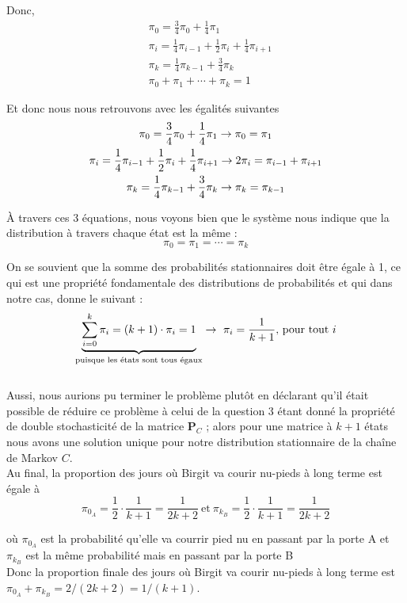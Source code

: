 \documentclass{article}
\begin{document}
   
    Donc,
    \begin{align}
        &\pi_0 = \frac{3}{4}\pi_0 + \frac{1}{4}\pi_1 \\
        &\pi_i = \frac{1}{4}\pi_{i-1} + \frac{1}{2}\pi_i + \frac{1}{4}\pi_{i+1} \\
        &\pi_k = \frac{1}{4}\pi_{k-1} + \frac{3}{4}\pi_k \\
        &\pi_0 + \pi_1 + \cdots + \pi_k = 1 
    \end{align}

    \vspace{.2cm}
    Et donc nous nous retrouvons avec les égalités suivantes
    \begin{gather}
        \pi_0 = \frac{3}{4}\pi_0 + \frac{1}{4}\pi_1 \to \pi_0 = \pi_1 \notag \\
        \pi_i = \frac{1}{4}\pi_{i-1} + \frac{1}{2}\pi_i + \frac{1}{4}\pi_{i+1} \to 2\pi_i = \pi_{i-1} + \pi_{i+1} \notag \\
        \pi_k = \frac{1}{4}\pi_{k-1} + \frac{3}{4}\pi_k \to \pi_k = \pi_{k-1} \notag 
    \end{gather}

    À travers ces 3 équations, nous voyons bien que le système nous indique que la distribution à travers chaque état est la même :
    \[
        \pi_0 = \pi_1 = \cdots = \pi_k
    \]

    On se souvient que la somme des probabilités stationnaires doit être égale à 1, ce qui est une propriété fondamentale des distributions de probabilités et qui dans notre cas, donne le suivant :
    \[
        \underbrace{\sum^k_{i=0} \pi_i = (k + 1) \cdot \pi_i = 1}_{\text{puisque les états sont tous égaux}} \rightarrow\ \pi_i = \frac{1}{k + 1},\, \text{pour tout } i \notag
    \] \\

    Aussi, nous aurions pu terminer le problème plutôt en déclarant qu'il était possible de réduire ce problème à celui de la question 3 étant donné la propriété de double stochasticité de la matrice $\boldsymbol{P}_C$ ; alors pour une matrice à $k + 1$ états nous avons une solution unique pour notre distribution stationnaire de la chaîne de Markov $C$. \\

    Au final, la proportion des jours où Birgit va courir nu-pieds à long terme est égale à 
    \[
        \pi_{0_A} = \frac{1}{2} \cdot \frac{1}{k+1} = \frac{1}{2k+2}\ \text{et}\ \pi_{k_B} = \frac{1}{2} \cdot \frac{1}{k+1} = \frac{1}{2k+2}
    \]
    
    \hspace{.5cm} où $\pi_{0_A}$ est la probabilité qu'elle va courrir pied nu en passant par la porte A et $\pi_{k_B}$ est la même probabilité mais en passant par la porte B \\

    Donc la proportion finale des jours où Birgit va courir nu-pieds à long terme est \(\pi_{0_A} + \pi_{k_B} = 2/(2k+2) = 1/(k+1)\). 
\end{document}
